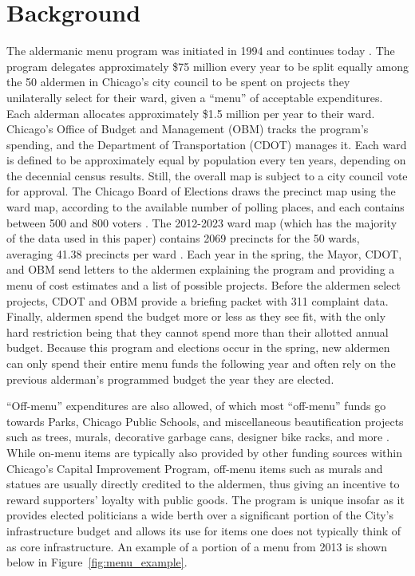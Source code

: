 \section{Background}\label{sec:background}

The aldermanic menu program was initiated in 1994 and continues today \citep{OIGaudit}. 
The program delegates approximately \$75 million every year to be split equally among the 50 aldermen in Chicago's city council to be spent on projects they unilaterally select for their ward, given a ``menu'' of acceptable expenditures. 
Each alderman allocates approximately \$1.5 million per year to their ward.
Chicago's Office of Budget and Management (OBM) tracks the program's spending, and the Department of Transportation (CDOT) manages it.
Each ward is defined to be approximately equal by population every ten years, depending on the decennial census results. Still, the overall map is subject to a city council vote for approval.
The Chicago Board of Elections draws the precinct map using the ward map, according to the available number of polling places, and each contains between 500 and 800 voters \citep{Crowley_2022}.
The 2012-2023 ward map (which has the majority of the data used in this paper) contains 2069 precincts for the 50 wards, averaging 41.38 precincts per ward \citep{Crowley_2022}.
Each year in the spring, the Mayor, CDOT, and OBM send letters to the aldermen explaining the program and providing a menu of cost estimates and a list of possible projects.
Before the aldermen select projects, CDOT and OBM provide a briefing packet with 311 complaint data.
Finally, aldermen spend the budget more or less as they see fit, with the only hard restriction being that they cannot spend more than their allotted annual budget.
Because this program and elections occur in the spring, new aldermen can only spend their entire menu funds the following year and often rely on the previous alderman's programmed budget the year they are elected.

``Off-menu'' expenditures are also allowed, of which most ``off-menu'' funds go towards Parks, Chicago Public Schools, and miscellaneous beautification projects such as trees, murals, decorative garbage cans, designer bike racks, and more \citep{OIGaudit}. 
While on-menu items are typically also provided by other funding sources within Chicago's Capital Improvement Program, off-menu items such as murals and statues are usually directly credited to the aldermen, thus giving an incentive to reward supporters' loyalty with public goods.
The program is unique insofar as it provides elected politicians a wide berth over a significant portion of the City's infrastructure budget and allows its use for items one does not typically think of as core infrastructure. 
An example of a portion of a menu from 2013 is shown below in Figure~\ref{fig:menu_example}.


